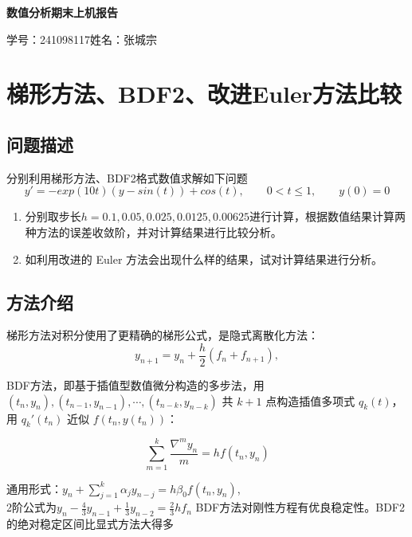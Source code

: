 \documentclass[UTF8,a4paper,11pt]{ctexart}                    %
\begin{document}

\begin{center}                                                %
  {\LARGE\bfseries 数值分析期末上机报告}

  \vspace{0.3em}
  学号：241098117\qquad 姓名：张城宗
\end{center}

\section{梯形方法、BDF2、改进Euler方法比较}

\subsection{问题描述}

分别利用梯形方法、BDF2格式数值求解如下问题
\[
  y'=-exp(10t)(y-sin(t))+cos(t),\qquad
  0 <t\le 1,\qquad y(0)=0
\]


\begin{enumerate}
  \item 分别取步长$h=0.1,0.05,0.025,0.0125,0.00625$进行计算，根据数值结果计算两种方法的误差收敛阶，并对计算结果进行比较分析。
  \item 如利用改进的 Euler 方法会出现什么样的结果，试对计算结果进行分析。
\end{enumerate}

\subsection{方法介绍}

梯形方法对积分使用了更精确的梯形公式，是隐式离散化方法：
\[
  y_{n+1}=y_n+\frac{h}{2}(f_n+f_{n+1}),
\]

BDF方法，即基于插值型数值微分构造的多步法，用 $(t_n,y_n),(t_{n-1},y_{n-1}),\cdots,(t_{n-k},y_{n-k})$ 共 $k+1$ 点构造插值多项式 $q_k(t)$，用 $q_k'(t_n)$ 近似 $f(t_n, y(t_n))$：

$$\sum_{m=1}^{k} \frac{\nabla^m y_n}{m} = hf(t_n, y_n)$$

通用形式：$y_n + \sum_{j=1}^{k} \alpha_j y_{n-j} = h\beta_0 f(t_n, y_n)$,
\\2阶公式为$y_n - \frac{4}{3}y_{n-1} + \frac{1}{3}y_{n-2} = \frac{2}{3}hf_n$
BDF方法对刚性方程有优良稳定性。BDF2 的绝对稳定区间比显式方法大得多
\end{document}
